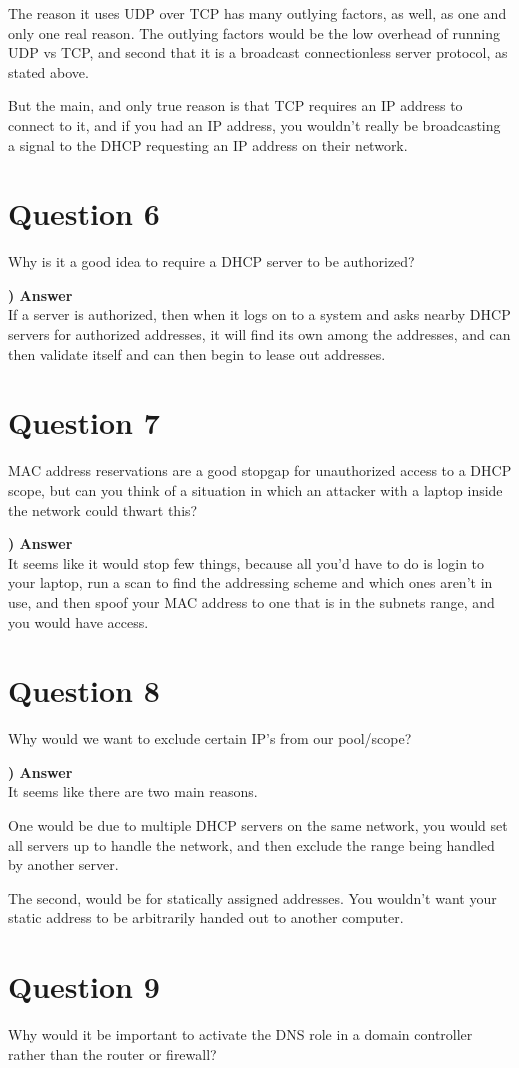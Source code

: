 \documentclass{report}
\newcommand{\mysection}[1]{\section*{#1}}
\newcommand{\mysubsection}[2]{\textbf{\romannumeral #1) #2}}
\begin{document}
The reason it uses UDP over TCP has many outlying factors, as well, as one and only one
real reason. The outlying factors would be the low overhead of running UDP vs TCP, and
second that it is a broadcast connectionless server protocol, as stated above. 

But the main, and only true reason is that TCP requires an IP address to connect to it,
and if you had an IP address, you wouldn't really be broadcasting a signal to the DHCP
requesting an IP address on their network. 


\mysection{\textbf{Question 6}}
Why is it a good idea to require a DHCP server to be authorized?

\noindent\mysubsection{6}{Answer}
\\If a server is authorized, then when it logs on to a system and asks nearby DHCP
servers for authorized addresses, it will find its own among the addresses, and can
then validate itself and can then begin to lease out addresses.


\mysection{\textbf{Question 7}}
MAC address reservations are a good stopgap for unauthorized access to a DHCP scope, but can you think of a situation in which an attacker with a laptop inside the network could thwart this?

\noindent\mysubsection{7}{Answer}
\\It seems like it would stop few things, because all you'd have to do is login to
your laptop, run a scan to find the addressing scheme and which ones aren't in use, and
then spoof your MAC address to one that is in the subnets range, and you would have
access.


\mysection{\textbf{Question 8}}
Why would we want to exclude certain IP's from our pool/scope?

\noindent\mysubsection{8}{Answer}
\\It seems like there are two main reasons. 

One would be due to multiple DHCP servers on the same network, you would set all
servers up to handle the network, and then exclude the range being handled by another
server.

The second, would be for statically assigned addresses. You wouldn't want your static
address to be arbitrarily handed out to another computer.

\mysection{\textbf{Question 9}}
Why would it be important to activate the DNS role in a domain controller rather than the router or firewall?
\end{document}
